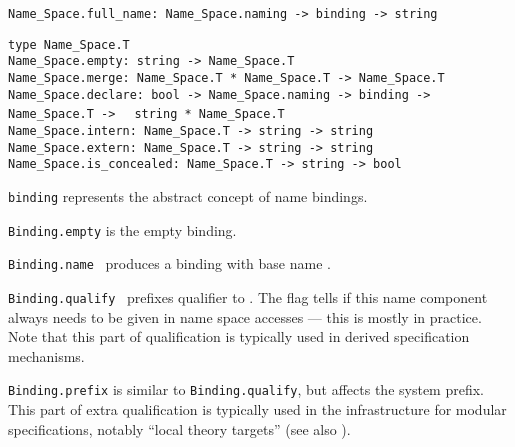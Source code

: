 \begin{isabellebody}
\begin{isamarkuptext}
\begin{mldecls}
  \verb|Name_Space.full_name: Name_Space.naming -> binding -> string| \\
  \end{mldecls}
  \begin{mldecls}
  \verb|type Name_Space.T| \\
  \verb|Name_Space.empty: string -> Name_Space.T| \\
  \verb|Name_Space.merge: Name_Space.T * Name_Space.T -> Name_Space.T| \\
  \verb|Name_Space.declare: bool -> Name_Space.naming -> binding -> Name_Space.T ->|\isasep\isanewline%
\verb|  string * Name_Space.T| \\
  \verb|Name_Space.intern: Name_Space.T -> string -> string| \\
  \verb|Name_Space.extern: Name_Space.T -> string -> string| \\
  \verb|Name_Space.is_concealed: Name_Space.T -> string -> bool|
  \end{mldecls}

  \begin{description}

  \item \verb|binding| represents the abstract concept of name
  bindings.

  \item \verb|Binding.empty| is the empty binding.

  \item \verb|Binding.name|~ produces a binding with base
  name .

  \item \verb|Binding.qualify|~
  prefixes qualifier  to .  The  flag tells if this name component always needs to be
  given in name space accesses --- this is mostly  in
  practice.  Note that this part of qualification is typically used in
  derived specification mechanisms.

  \item \verb|Binding.prefix| is similar to \verb|Binding.qualify|, but
  affects the system prefix.  This part of extra qualification is
  typically used in the infrastructure for modular specifications,
  notably ``local theory targets'' (see also ).


\end{description}
\end{isamarkuptext}
\end{isabellebody}
